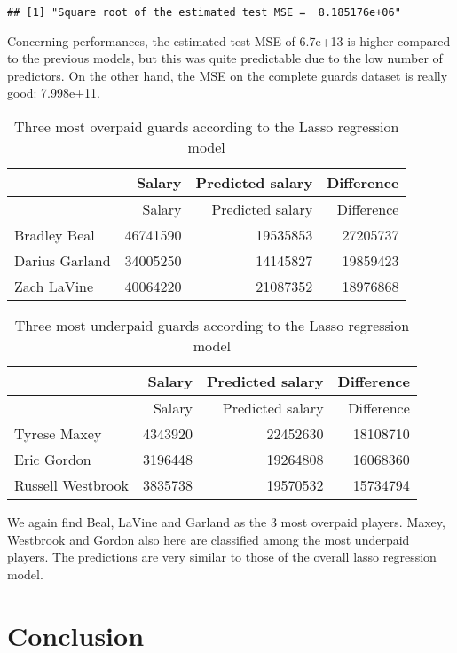 \documentclass[
]{article}
\begin{document}
\begin{verbatim}
## [1] "Square root of the estimated test MSE =  8.185176e+06"
\end{verbatim}

Concerning performances, the estimated test MSE of 6.7e+13 is higher
compared to the previous models, but this was quite predictable due to
the low number of predictors. On the other hand, the MSE on the complete
guards dataset is really good: 7.998e+11.

\begin{longtable}[]{@{}lrrr@{}}
\caption{Three most overpaid guards according to the Lasso regression
model}\tabularnewline
\toprule()
& Salary & Predicted salary & Difference \\
\midrule()
\endfirsthead
\toprule()
& Salary & Predicted salary & Difference \\
\midrule()
\endhead
Bradley Beal & 46741590 & 19535853 & 27205737 \\
Darius Garland & 34005250 & 14145827 & 19859423 \\
Zach LaVine & 40064220 & 21087352 & 18976868 \\
\bottomrule()
\end{longtable}

\begin{longtable}[]{@{}lrrr@{}}
\caption{Three most underpaid guards according to the Lasso regression
model}\tabularnewline
\toprule()
& Salary & Predicted salary & Difference \\
\midrule()
\endfirsthead
\toprule()
& Salary & Predicted salary & Difference \\
\midrule()
\endhead
Tyrese Maxey & 4343920 & 22452630 & 18108710 \\
Eric Gordon & 3196448 & 19264808 & 16068360 \\
Russell Westbrook & 3835738 & 19570532 & 15734794 \\
\bottomrule()
\end{longtable}

We again find Beal, LaVine and Garland as the 3 most overpaid players.
Maxey, Westbrook and Gordon also here are classified among the most
underpaid players. The predictions are very similar to those of the
overall lasso regression model.

\hypertarget{conclusion}{%
\section{Conclusion}\label{conclusion}}
\end{document}
